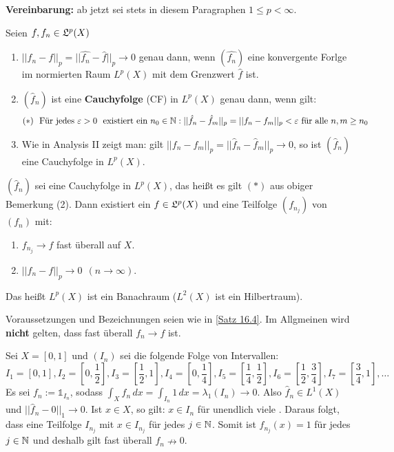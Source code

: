 \documentclass[a4paper,twoside,DIV15,BCOR12mm,chapterprefix=true,headings=onelinechapter]{scrbook}
\begin{document}
\textbf{Vereinbarung:} ab jetzt sei stets in diesem Paragraphen $1 \leq p < \infty$.

\begin{bemerkung}
Seien \(f,f_n\in\mathfrak{L}^p(X)\)
\begin{enumerate}
\item 	\(\lvert\lvert f_n-f\rvert\rvert_p = \lvert\lvert \hat{f_n}-\hat f\rvert\rvert_p\to 0\) genau
		dann, wenn \((\hat{f_n})\) eine konvergente Forlge im normierten Raum \(L^p(X)\) 
 		mit dem Grenzwert \(\hat f\) ist.
\item 	\((\hat f_n)\) ist eine \textbf{Cauchyfolge} (CF) in \(L^p(X)\) genau dann, wenn gilt:
		\[(\ast)\ \text{ Für jedes }\varepsilon>0\ \text{ existiert ein } n_0\in\mathbb{N}: \lvert\lvert \hat
		f_n-\hat f_m\rvert\rvert_p	=\lvert\lvert f_n-f_m\rvert\rvert_p<\varepsilon
		\text{ für alle } n,m\geq n_0\]
\item 	Wie in Analysis II zeigt man: gilt \(\lvert\lvert f_n-f_m\rvert\rvert_p=
		\lvert\lvert \hat f_n-\hat f_m\rvert\rvert_p\to 0\), so ist \((\hat f_n)\) eine Cauchyfolge
		in \(L^p(X)\).
\end{enumerate}
\end{bemerkung}

\begin{satz}
\label{Satz 16.4}
\((\hat f_n)\) sei eine Cauchyfolge in \(L^p(X)\), das heißt es gilt \((\ast)\) aus obiger Bemerkung (2).
Dann existiert ein \(f\in\mathfrak{L}^p(X)\) und eine Teilfolge \((f_{n_j})\) von \((f_n)\) mit:
\begin{enumerate}
\item 	\(f_{n_j}\to f\) fast überall auf \(X\).
\item 	\(\lvert\lvert f_n-f\rvert\rvert_p\to 0 \ \ (n\to\infty)\).
\end{enumerate}
Das heißt \(L^p(X)\) ist ein Banachraum (\(L^2(X)\) ist ein Hilbertraum).
\end{satz}

\begin{bemerkung}
Voraussetzungen und Bezeichnungen seien wie in \ref{Satz 16.4}. Im Allgmeinen wird \textbf{nicht}
gelten, dass fast überall \(f_n\to f\) ist.
\end{bemerkung}

\begin{beispiel}
Sei \(X=[0,1]\) und \((I_n)\) sei die folgende Folge von Intervallen:
\[I_1=\left[0,1\right], I_2=\left[0,\frac12\right], I_3=\left[\frac12,1\right], I_4=\left[0,\frac14\right],
I_5=\left[\frac14,\frac12\right], I_6=\left[\frac12, \frac34\right], I_7=\left[\frac34,1\right], \ldots\]
Es sei \(f_n:=\mathds{1}_{I_n}\), sodass \(\int_X f_n\,dx=\int_{I_n}1\,dx=\lambda_1(I_n)\to 0\).
Also \(\hat f_n\in L^1(X)\) und \(\lvert\lvert \hat f_n-\hat 0\rvert\rvert_1\to 0\). 
Ist \(x\in X\), so gilt: \(x\in I_n\) für unendlich viele \natn. Daraus folgt, dass eine Teilfolge 
\(I_{n_j}\) mit \(x\in I_{n_j}\) für jedes \(j\in\mathbb{N}\). Somit ist \(f_{n_j}(x)=1\) für jedes \(j\in\mathbb{N}\)
und deshalb gilt fast überall \(f_n\nrightarrow 0\).
\end{beispiel}
\end{document}
